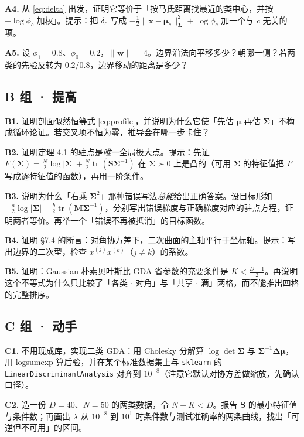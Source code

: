 \documentclass[11pt,a4paper,fontset=windows,zihao=-4]{ctexart}
\newcommand{\bw}{\mathbf{w}}
\newcommand{\bx}{\mathbf{x}}
\newcommand{\bM}{\mathbf{M}}
\newcommand{\bS}{\mathbf{S}}
\newcommand{\bSigma}{\boldsymbol{\Sigma}}
\newcommand{\bmu}{\boldsymbol{\mu}}
\newcommand{\bDelta}{\boldsymbol{\Delta}}
\newcommand{\norm}[1]{\lVert #1\rVert}
\newcommand{\abs}[1]{\lvert #1\rvert}
\DeclareMathOperator{\tr}{tr}
\begin{document}
\noindent\textbf{A4.} 从 \eqref{eq:delta} 出发，证明它等价于「按马氏距离找最近的类中心，并按 $-\log\phi_c$ 加权」。提示：把 $\delta_c$ 写成 $-\frac12\norm{\bx-\bmu_c}^2_{\bSigma}+\log\phi_c$ 加一个与 $c$ 无关的项。

\noindent\textbf{A5.} 设 $\phi_1=0.8$、$\phi_0=0.2$，$\norm{\bw}=4$。边界沿法向平移多少？朝哪一侧？若两类的先验反转为 $0.2/0.8$，边界移动的距离是多少？

\subsection*{B 组 · 提高}

\noindent\textbf{B1.} 证明剖面似然恒等式 \eqref{eq:profile}，并说明为什么它使「先估 $\bmu$ 再估 $\bSigma$」不构成循环论证。若交叉项不恒为零，推导会在哪一步卡住？

\noindent\textbf{B2.} 证明定理 4.1 的驻点是\emph{唯一}全局极大点。提示：先证 $F(\bSigma)=\frac N2\log\abs{\bSigma}+\frac N2\tr(\bS\bSigma^{-1})$ 在 $\bSigma\succ0$ 上是凸的（可用 $\bSigma$ 的特征值把 $F$ 写成逐特征值的函数），再用一阶条件。

\noindent\textbf{B3.} 说明为什么「右乘 $\bSigma^2$」那种错误写法\emph{总能}给出正确答案。设目标形如 $-\frac a2\log\abs{\bSigma}-\frac b2\tr(\bM\bSigma^{-1})$，分别写出错误梯度与正确梯度对应的驻点方程，证明两者等价。再举一个「错误不再被抵消」的目标函数。

\noindent\textbf{B4.} 证明 §7.4 的断言：对角协方差下，二次曲面的主轴平行于坐标轴。提示：写出边界的二次型，检查 $x^{(j)}x^{(k)}$（$j\ne k$）的系数。

\noindent\textbf{B5.} 证明：Gaussian 朴素贝叶斯比 GDA 省参数的充要条件是 $K<\frac{D+1}{2}$。再说明这个不等式为什么只比较了「各类 $\cdot$ 对角」与「共享 $\cdot$ 满」两格，而不能推出四格的完整排序。

\subsection*{C 组 · 动手}

\noindent\textbf{C1.} 不用现成库，实现二类 GDA：用 Cholesky 分解算 $\log\det\bSigma$ 与 $\bSigma^{-1}\bDelta\bmu$，用 logsumexp 算后验，并在某个标准数据集上与 \texttt{sklearn} 的 \texttt{LinearDiscriminantAnalysis} 对齐到 $10^{-8}$（注意它默认对协方差做缩放，先确认口径）。

\noindent\textbf{C2.} 造一份 $D=40$、$N=50$ 的两类数据，令 $N-K<D$。报告 $\bS$ 的最小特征值与条件数；再画出 $\lambda$ 从 $10^{-8}$ 到 $10^{1}$ 时条件数与测试准确率的两条曲线，找出「可逆但不可用」的区间。
\end{document}
